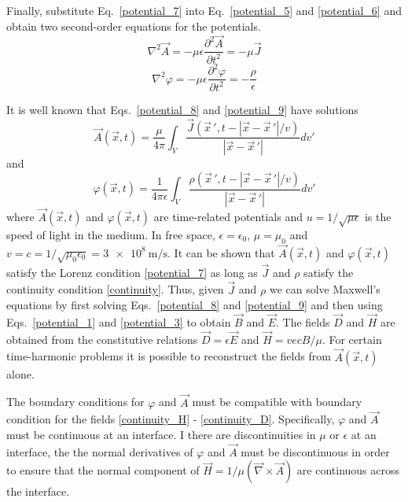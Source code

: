 \documentclass[11pt,a4paper,oneside]{book}
\numberwithin{equation}{section}
\newcommand{\abs}[1]{\left|#1\right|}
\theoremstyle{it}
\theoremstyle{definition}
\begin{document}
Finally, substitute Eq.~\eqref{potential_7} into Eq.~\eqref{potential_5} and \ref{potential_6} and obtain two second-order equations for the potentials.
\begin{equation}\label{potential_8}
	\nabla^2\vec{A}= -\mu\epsilon\frac{\partial^2\vec{A}}{\partial t^2} = -\mu\vec{J}
\end{equation}
\begin{equation}\label{potential_9}
	\nabla^2\varphi= -\mu\epsilon\frac{\partial^2\varphi}{\partial t^2} = -\frac{\rho}{\epsilon}
\end{equation}

It is well known that Eqs.~\eqref{potential_8} and \ref{potential_9} have solutions
\begin{equation}\label{potential_10}
	\vec{A}(\vec{x},t)=\frac{\mu}{4\pi}\int_{V}\frac{\vec{J}(\vec{x}\,',t-\abs{\vec{x}-\vec{x}\,'}/v)}{\abs{\vec{x}- \vec{x}\,'}}dv'
\end{equation}
and
\begin{equation}\label{potential_11}
	{\varphi}(\vec{x},t)=\frac{1}{4\pi\epsilon}\int_{V}\frac{\rho(\vec{x}\,',t-\abs{\vec{x}-\vec{x}\,'}/v)}{\abs{\vec{x}- \vec{x}\,'}}dv'
\end{equation}
where $\vec{A}(\vec{x},t)$ and $\varphi(\vec{x},t)$ are time-related potentials and $u=1/\sqrt{\mu\epsilon}$ is the speed of light in the medium. In free space, $\epsilon=\epsilon_0$, $\mu=\mu_0$ and $v=c=1/\sqrt{\mu_0\epsilon_0}=\SI{3e8}{\meter\per\second}$. It can be shown that $\vec{A}(\vec{x},t)$ and $\varphi(\vec{x},t)$ satisfy the Lorenz condition \ref{potential_7} as long as $\vec{J}$ and $\rho$ satisfy the continuity condition \ref{continuity}. Thus, given $\vec{J}$ and $\rho$ we can solve Maxwell's equations by first solving Eqs.~\eqref{potential_8} and \ref{potential_9} and then using Eqs.~\eqref{potential_1} and \ref{potential_3} to obtain $\vec{B}$ and $\vec{E}$. The fields $\vec{D}$ and $\vec{H}$ are obtained from the constitutive relations $\vec{D}=\epsilon\vec{E}$ and $\vec{H}=vec{B}/\mu$. For certain time-harmonic problems it is possible to reconstruct the fields from $\vec{A}(\vec{x},t)$ alone.

The boundary conditions for $\varphi$ and $\vec{A}$ must be compatible with boundary condition for the fields \ref{continuity_H} - \ref{continuity_D}. Specifically, $\varphi$ and $\vec{A}$ must be continuous at an interface. I there are discontinuities in $\mu$ or $\epsilon$ at an interface, the the normal derivatives of $\varphi$ and $\vec{A}$ must be discontinuous in order to ensure that the normal component of $\vec{H}=1/\mu(\vec{\nabla}\times\vec{A})$ are continuous across the interface.
\end{document}
